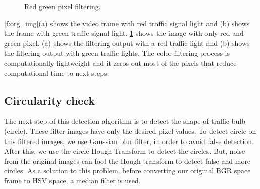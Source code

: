 \begin{figure}[!ht]
\centering
{}

\caption{Red green pixel filtering.}
\label{f:fil_img}
\end{figure}

\ref{f:org_img}(a) shows the video frame with red traffic signal light and (b) shows the frame with green traffic signal light.
\ref{f:fil_img} shows the image with only red and green pixel.
(a) shows the filtering output with a red traffic light and (b) shows the filtering output with green traffic lights.
The color filtering process is computationally lightweight and it zeros out most of the pixels that reduce computational time to next steps.

\subsection{Circularity check}
The next step of this detection algorithm is to detect the shape of traffic bulb (circle).
These filter images have only the desired pixel values.
To detect circle on this filtered images, we use Gaussian blur filter, in order to avoid false detection.
After this, we use the circle Hough Transform \cite{hough_circle} to detect the circles.
But, noise from the original images can fool the Hough transform to detect false and more circles.
As a solution to this problem, before converting our original BGR space frame to HSV space, a median filter is used.

